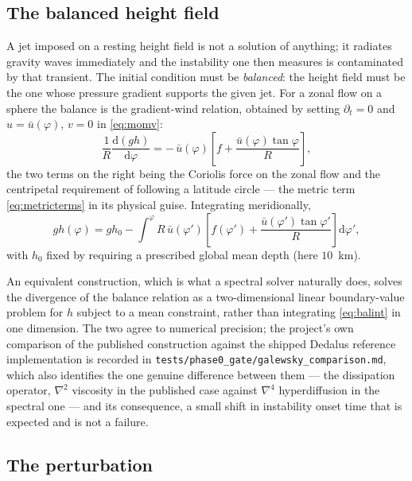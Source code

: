 \documentclass[11pt,a4paper]{article}
\newcommand{\file}[1]{\texttt{\nolinkurl{#1}}}
\newcommand{\dd}{\mathrm{d}}
\begin{document}
\subsection{The balanced height field}

A jet imposed on a resting height field is not a solution of anything; it
radiates gravity waves immediately and the instability one then measures is
contaminated by that transient. The initial condition must be \emph{balanced}:
the height field must be the one whose pressure gradient supports the given jet.
For a zonal flow on a sphere the balance is the gradient-wind relation, obtained
by setting $\partial_t = 0$ and $u = \bar u(\varphi)$, $v = 0$ in
\eqref{eq:momv}:
%
\begin{equation}
\frac{1}{R}\frac{\dd (g h)}{\dd\varphi}
 = -\,\bar u(\varphi)\left[f + \frac{\bar u(\varphi)\tan\varphi}{R}\right] ,
\label{eq:gradwind}
\end{equation}
%
the two terms on the right being the Coriolis force on the zonal flow and the
centripetal requirement of following a latitude circle --- the metric term
\eqref{eq:metricterms} in its physical guise. Integrating meridionally,
%
\begin{equation}
g h(\varphi) = g h_0 - \int^{\varphi}
  R\,\bar u(\varphi')\left[f(\varphi')
  + \frac{\bar u(\varphi')\tan\varphi'}{R}\right]\dd\varphi' ,
\label{eq:balint}
\end{equation}
%
with $h_0$ fixed by requiring a prescribed global mean depth (here $10$~km).

An equivalent construction, which is what a spectral solver naturally does,
solves the divergence of the balance relation as a two-dimensional linear
boundary-value problem for $h$ subject to a mean constraint, rather than
integrating \eqref{eq:balint} in one dimension. The two agree to numerical
precision; the project's own comparison of the published construction against
the shipped Dedalus reference implementation is recorded in
\file{tests/phase0_gate/galewsky_comparison.md}, which also identifies the
one genuine difference between them --- the dissipation operator, $\nabla^2$
viscosity in the published case against $\nabla^4$ hyperdiffusion in the
spectral one --- and its consequence, a small shift in instability onset time
that is expected and is not a failure.

\subsection{The perturbation}
\end{document}
